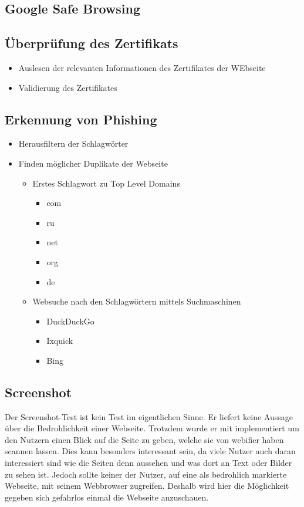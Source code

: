 \subsection{Google Safe Browsing}


\subsection{Überprüfung des Zertifikats}


\begin{itemize}
  \item Auslesen der relevanten Informationen des Zertifikates der WEbseite
  \item Validierung des Zertifikates
\end{itemize}

\subsection{Erkennung von Phishing}


\begin{itemize}
  \item Herausfiltern der Schlagwörter
  \item Finden möglicher Duplikate der Webseite
  \begin{itemize}
    \item Erstes Schlagwort zu Top Level Domains
    \begin{itemize}
      \item com
      \item ru
      \item net
      \item org
      \item de
    \end{itemize}
    \item Websuche nach den Schlagwörtern mittels Suchmaschinen
    \begin{itemize}
      \item DuckDuckGo
      \item Ixquick
      \item Bing
    \end{itemize}
  \end{itemize}
\end{itemize}

\subsection{Screenshot}
Der Screenshot-Test ist kein Test im eigentlichen Sinne. Er liefert keine Aussage über die Bedrohlichkeit einer Webseite. Trotzdem wurde er mit implementiert um den Nutzern einen Blick auf die Seite zu geben, welche sie von webifier haben scannen lassen. Dies kann besonders interessant sein, da viele Nutzer auch daran interessiert sind wie die Seiten denn aussehen und was dort an Text oder Bilder zu sehen ist. Jedoch sollte keiner der Nutzer, auf eine als bedrohlich markierte Webseite, mit seinem Webbrowser zugreifen. Deshalb wird hier die Möglichkeit gegeben sich gefahrlos einmal die Webseite anzuschauen.
